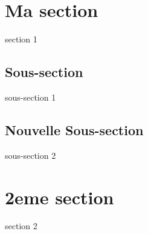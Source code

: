 \documentclass {article}
\begin{document}
\tableofcontents
\section{Ma section} section 1
\subsection{Sous-section} sous-section 1
\subsection{Nouvelle Sous-section} sous-section 2
\section{2eme section} section 2
\end{document}
